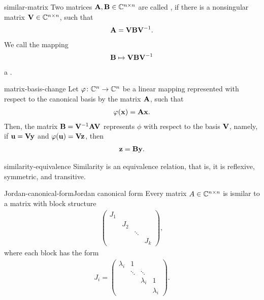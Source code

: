 \begin{Definition}{similar-matrix}
  Two matrices $\mathbf A,\mathbf B\in\mathbb C^{n\times n}$ are called , if there is a nonsingular matrix $\mathbf V\in\mathbb C^{n\times n}$, such that
  \begin{gather}
      \mathbf A = \mathbf V \mathbf B \mathbf V^{-1}.
  \end{gather}
  We call the mapping
  \begin{gather}
      \mathbf B \mapsto \mathbf V \mathbf B \mathbf V^{-1}
  \end{gather}
  a .
\end{Definition}

\begin{Lemma}{matrix-basis-change}
  Let $\varphi\colon \mathbb C^n\to \mathbb C^n$ be a linear mapping represented with
  respect to the canonical basis by the matrix $\mathbf A$, such that
  \begin{gather}
    \varphi(\mathbf x) = \mathbf A \mathbf x.
  \end{gather}
  Then, the matrix $\mathbf B = \mathbf V^{-1}\mathbf A\mathbf V$ represents $\phi$
  with respect to the basis $\mathbf V$, namely, if $\mathbf u = \mathbf V \mathbf y$ and
  $\varphi(\mathbf u) = \mathbf V \mathbf z$, then
  \begin{gather}
    \mathbf z = \mathbf B \mathbf y.
  \end{gather}
\end{Lemma}

\begin{Lemma}{similarity-equivalence}
  Similarity is an equivalence relation, that is, it is reflexive,
  symmetric, and transitive.
\end{Lemma}

\begin{Theorem*}{Jordan-canonical-form}{Jordan canonical form}
  Every matrix $A\in\mathbb C^{n\times n}$ is ismilar to a matrix with block structure
  \begin{gather}
    \begin{pmatrix}
      J_1\\&J_2\\&&\ddots\\&&&J_k
    \end{pmatrix},
  \end{gather}
  where each block has the form
  \begin{gather}
    J_i = \begin{pmatrix}
      \lambda_i&1\\&\ddots&\ddots\\
      &&\lambda_i&1\\
      &&&\lambda_i
    \end{pmatrix}.
  \end{gather}
\end{Theorem*}



